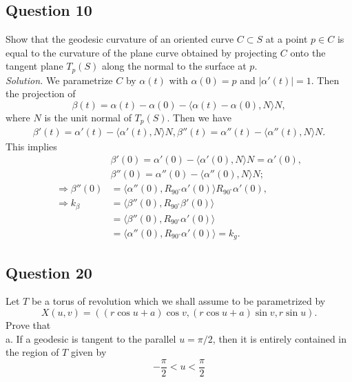 \documentclass[12pt]{article}
\begin{document}
\subsection*{Question 10}
Show that the geodesic curvature of an oriented curve $C \subset S$ at a point $p \in C$ is equal to the curvature of the plane curve obtained by projecting $C$ onto the tangent plane $T_p(S)$ along the normal to the surface at $p$.\\

\textit{Solution.} We parametrize $C$ by $\alpha(t)$ with $\alpha(0)=p$ and $|\alpha'(t)|=1$. Then the projection of 
\begin{equation*}
    \beta(t) = \alpha(t)-\alpha(0) - \langle\alpha(t)-\alpha(0),N\rangle N,
\end{equation*}
where $N$ is the unit normal of $T_p(S)$. Then we have\begin{align*}
    \beta'(t) = \alpha'(t) - \langle\alpha'(t),N\rangle N,
    \beta''(t) = \alpha''(t) - \langle\alpha''(t),N\rangle N.
\end{align*} 
This implies \begin{align*}
    &\beta'(0) = \alpha'(0) - \langle\alpha'(0),N\rangle N = \alpha'(0),\\
    &\beta''(0) = \alpha''(0) - \langle \alpha''(0),N\rangle N;\\
    \Rightarrow  \beta''(0) &= \langle \alpha''(0),R_{90^\circ}\alpha'(0)\rangle R_{90^\circ}\alpha'(0),\\ 
    \Rightarrow  k_\beta &= \langle \beta''(0), R_{90^\circ}\beta'(0)\rangle \\
    &= \langle \beta''(0), R_{90^\circ}\alpha'(0)\rangle\\
    &= \langle \alpha''(0), R_{90^\circ}\alpha'(0)\rangle = k_g.
\end{align*}

\subsection*{Question 20}
Let $T$ be a torus of revolution which we shall assume to be parametrized by \begin{equation*}
    X(u, v)=((r\cos u+a)\cos v,(r\cos u+a)\sin v,r\sin u).
\end{equation*}
Prove that\\

a. If a geodesic is tangent to the parallel $u = \pi/2$, then it is entirely contained in the region of $T$ given by\begin{equation*}
    -\frac{\pi}{2}<u<\frac{\pi}{2}
\end{equation*}
\end{document}
